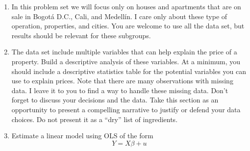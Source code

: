 \documentclass[12pt,onecolumn]{article}
\begin{document}
\begin{enumerate}
  \item In this problem set we will focus only on houses and apartments that are on sale in Bogotá D.C., Cali, and Medellín. I care only about these type of operation, properties, and cities. You are welcome to use all the data set, but results should be relevant for these subgroups.
  \item The data set include multiple variables that can help explain the price of a property.  Build a descriptive analysis of these variables. At a minimum, you should include a descriptive statistics table for the potential variables you can use to explain prices. Note that there are many observations with missing data. I leave it to you to find a way to handle these missing data. Don't forget to discuss your decisions and the data. Take this section as an opportunity to present a compelling narrative to justify or defend your data choices. Do not present it as a ``dry'' list of ingredients.
  \item Estimate a linear model using OLS of the form
  \begin{equation}
    Y = X\beta +u
  \end{equation}


\end{enumerate}
\end{document}
